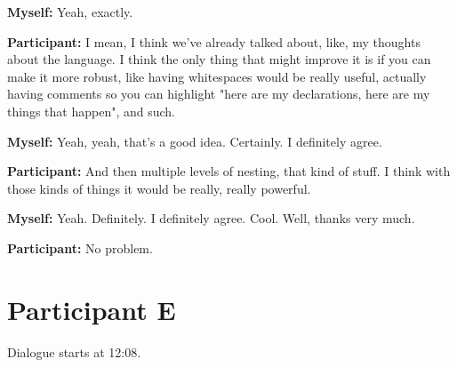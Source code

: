 \documentclass[11pt]{report}
\begin{document}
\begin{linenumbers}
\textbf{Myself:} Yeah, exactly.

\textbf{Participant:} I mean, I think we've already talked about, like, my thoughts about the language. I think the only thing that might improve it is if you can make it more robust, like having whitespaces would be really useful, actually having comments so you can highlight "here are my declarations, here are my things that happen", and such.

\textbf{Myself:} Yeah, yeah, that's a good idea. Certainly. I definitely agree.

\textbf{Participant:} And then multiple levels of nesting, that kind of stuff. I
think with those kinds of things it would be really, really powerful.

\textbf{Myself:} Yeah. Definitely. I definitely agree. Cool. Well, thanks very much.

\textbf{Participant:} No problem.

\end{linenumbers}
\resetlinenumber[1]
\section{Participant E}
Dialogue starts at 12:08.
\end{document}
